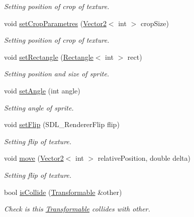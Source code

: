 \begin{DoxyCompactItemize}
\begin{DoxyCompactList}\small\item\em Setting position of crop of texture. \end{DoxyCompactList}\item 
void \hyperlink{class_virtual_1_1_transformable_a558026b1336c4f24c2bc70debc01800c}{set\+Crop\+Parametres} (\hyperlink{struct_virtual_1_1_vector2}{Vector2}$<$ int $>$ crop\+Size)
\begin{DoxyCompactList}\small\item\em Setting position of crop of texture. \end{DoxyCompactList}\item 
void \hyperlink{class_virtual_1_1_transformable_ad86a98728222a2b879afa41ba27dfc58}{set\+Rectangle} (\hyperlink{struct_virtual_1_1_rectangle}{Rectangle}$<$ int $>$ rect)
\begin{DoxyCompactList}\small\item\em Setting position and size of sprite. \end{DoxyCompactList}\item 
void \hyperlink{class_virtual_1_1_transformable_ae7305c3fe8a7bd9f4a1138a9d097bfab}{set\+Angle} (int angle)
\begin{DoxyCompactList}\small\item\em Setting angle of sprite. \end{DoxyCompactList}\item 
void \hyperlink{class_virtual_1_1_transformable_a4d0e9c61931af6b42fac1dc0c3a1ed21}{set\+Flip} (S\+D\+L\+\_\+\+Renderer\+Flip flip)
\begin{DoxyCompactList}\small\item\em Setting flip of texture. \end{DoxyCompactList}\item 
void \hyperlink{class_virtual_1_1_transformable_a80eb3848090682f3ad3bd3faf879f6ab}{move} (\hyperlink{struct_virtual_1_1_vector2}{Vector2}$<$ int $>$ relative\+Position, double delta)
\begin{DoxyCompactList}\small\item\em Setting flip of texture. \end{DoxyCompactList}\item 
bool \hyperlink{class_virtual_1_1_transformable_aae527eac3aa7053455e9064373592b21}{is\+Collide} (\hyperlink{class_virtual_1_1_transformable}{Transformable} \&other)
\begin{DoxyCompactList}\small\item\em Check is this \hyperlink{class_virtual_1_1_transformable}{Transformable} collides with other. \end{DoxyCompactList}\end{DoxyCompactItemize}
